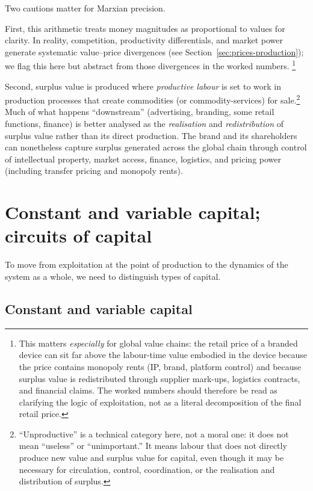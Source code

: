 Two cautions matter for Marxian precision.

First, this arithmetic treats money magnitudes as proportional to values for clarity.
In reality, competition, productivity differentials, and market power generate systematic
value--price divergences (see Section~\ref{sec:prices-production}); we flag this here but
abstract from those divergences in the worked numbers.
\footnote{This matters \emph{especially} for global value chains: the retail price of a branded device can sit far above the
labour-time value embodied in the device because the price contains monopoly rents (IP, brand, platform control) and because
surplus value is redistributed through supplier mark-ups, logistics contracts, and financial claims. The worked numbers should
therefore be read as clarifying the logic of exploitation, not as a literal decomposition of the final retail price.}

Second, surplus value is produced where \emph{productive labour} is set to work in production
processes that create commodities (or commodity-services) for sale.\footnote{``Unproductive'' is a technical category here, not a moral one: it does not mean ``useless'' or ``unimportant.'' It means labour that does not directly produce new value and surplus value for capital, even though it may be necessary for circulation, control, coordination, or the realisation and distribution of surplus.}
Much of what happens
``downstream'' (advertising, branding, some retail functions, finance) is better analysed as
the \emph{realisation} and \emph{redistribution} of surplus value rather than its direct
production. The brand and its shareholders can nonetheless capture surplus generated across
the global chain through control of intellectual property, market access, finance, logistics,
and pricing power (including transfer pricing and monopoly rents).\cite{Smith2016,Hickel2022}


\section{Constant and variable capital; circuits of capital}
\label{sec:constant-variable}

To move from exploitation at the point of production to the dynamics of the
system as a whole, we need to distinguish types of capital.\cite{Marx1867}

\subsection{Constant and variable capital}

